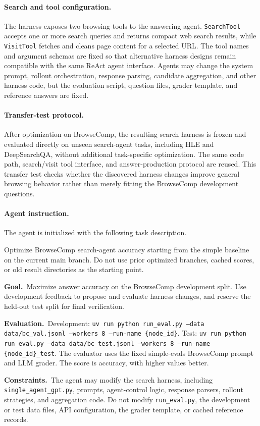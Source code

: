 \documentclass{llmxive}
\begin{document}
\paragraph{Search and tool configuration.}
The harness exposes two browsing tools to the answering agent.
\texttt{SearchTool} accepts one or more search queries and returns compact web
search results, while \texttt{VisitTool} fetches and cleans page content for a
selected URL.
The tool names and argument schemas are fixed so that alternative harness
designs remain compatible with the same ReAct agent interface.
Agents may change the system prompt, rollout orchestration, response parsing,
candidate aggregation, and other harness code, but the evaluation script,
question files, grader template, and reference answers are fixed.

\paragraph{Transfer-test protocol.}
After optimization on BrowseComp, the resulting search harness is frozen and
evaluated directly on unseen search-agent tasks, including HLE and
DeepSearchQA, without additional task-specific optimization.
The same code path, search/visit tool interface, and answer-production protocol
are reused.
This transfer test checks whether the discovered harness changes improve
general browsing behavior rather than merely fitting the BrowseComp development
questions.

\paragraph{Agent instruction.}
The agent is initialized with the following task description.

\begin{promptbox}[title=\textbf{BrowseComp Task Instruction}]
Optimize BrowseComp search-agent accuracy starting from the simple baseline on
the current main branch.
Do not use prior optimized branches, cached scores, or old result directories
as the starting point.

\smallskip
\noindent\textbf{Goal.}~Maximize answer accuracy on the BrowseComp
development split.
Use development feedback to propose and evaluate harness changes, and reserve
the held-out test split for final verification.

\smallskip
\noindent\textbf{Evaluation.}~Development:
\texttt{uv run python run\_eval.py --data data/bc\_val.jsonl --workers 8 --run-name \{node\_id\}}.
Test:
\texttt{uv run python run\_eval.py --data data/bc\_test.jsonl --workers 8 --run-name \{node\_id\}\_test}.
The evaluator uses the fixed simple-evals BrowseComp prompt and LLM grader.
The score is accuracy, with higher values better.

\smallskip
\noindent\textbf{Constraints.}~The agent may modify the search harness,
including \texttt{single\_agent\_gpt.py}, prompts, agent-control logic,
response parsers, rollout strategies, and aggregation code.
Do not modify \texttt{run\_eval.py}, the development or test data files, API
configuration, the grader template, or cached reference records.
\end{promptbox}
\end{document}
